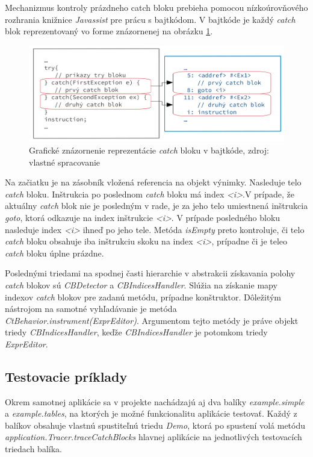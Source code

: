 \documentclass[11pt,final,oneside]{fithesis}
\begin{document}
Mechanizmus kontroly prázdneho catch bloku prebieha pomocou nízkoúrovňového 
rozhrania knižnice \textit{Javassist} pre prácu s bajtkódom. V bajtkóde je 
každý \textit{catch} blok reprezentovaný vo forme znázornenej na obrázku 
\ref{fig:catch}.

\begin{figure}[h]
  \centering
   \includegraphics[width=\textwidth]{catch.png}
  \caption{Grafické znázornenie reprezentácie \textit{catch} bloku v bajtkóde,
  zdroj: vlastné spracovanie}
  \label{fig:catch}
\end{figure}

Na začiatku je na zásobník vložená referencia na objekt výnimky. Nasleduje telo
\textit{catch} bloku. Inštrukcia po poslednom \textit{catch} bloku má index 
\textit{<i>}.V prípade, že aktuálny \textit{catch} blok nie je posledným v 
rade, je za jeho telo umiestnená inštrukcia \textit{goto}, ktorá odkazuje na 
index inštrukcie \textit{<i>}. V prípade posledného bloku nasleduje index 
\textit{<i>} ihneď po jeho tele. Metóda \textit{isEmpty} preto kontroluje, či 
telo \textit{catch} bloku obsahuje iba inštrukciu skoku na index \textit{<i>}, 
prípadne či je teleo \textit{catch} bloku úplne prázdne. 

Poslednými triedami na spodnej časti hierarchie v abstrakcii získavania polohy 
\textit{catch} blokov sú \textit{CBDetector} a \textit{CBIndicesHandler}. 
Slúžia na získanie mapy indexov \textit{catch} blokov pre zadanú metódu, 
prípadne konštruktor. Dôležitým nástrojom na samotné vyhľadávanie je metóda 
\textit{CtBehavior.instrument(ExprEditor)}. Argumentom tejto metódy je práve 
objekt triedy \textit{CBIndicesHandler}, keďže \textit{CBIndicesHandler} je 
potomkom triedy \textit{ExprEditor}.

\subsection{Testovacie príklady}
Okrem samotnej aplikácie sa v projekte nachádzajú aj dva balíky 
\textit{example.simple} a \textit{example.tables}, na ktorých je možné 
funkcionalitu aplikácie testovať. Každý z balíkov obsahuje vlastnú spustiteľnú 
triedu \textit{Demo}, ktorá po spustení volá metódu 
\textit{application.Tracer.traceCatchBlocks} hlavnej aplikácie na jednotlivých 
testovacích triedach balíka. 
\end{document}
